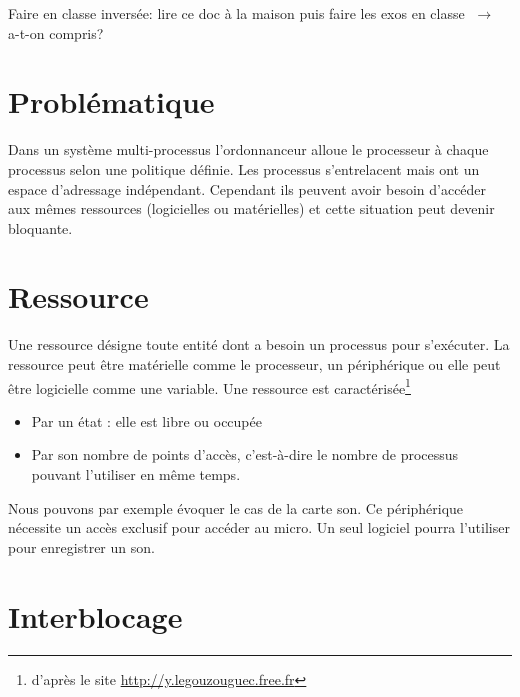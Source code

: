 \documentclass[a4paper,11pt]{article}
\begin{document}
\begin{Form}
\begin{commentprof}
Faire en classe inversée: lire ce doc à la maison puis faire les exos en classe $\;\rightarrow\;$ a-t-on compris?
\end{commentprof}
\section{Problématique}
Dans un système multi-processus l'ordonnanceur alloue le processeur à chaque processus selon une politique définie. Les processus s’entrelacent mais ont un espace d'adressage indépendant. Cependant ils peuvent avoir besoin d'accéder aux mêmes ressources (logicielles ou matérielles) et cette situation peut devenir bloquante.
\begin{center}
\end{center}
\section{Ressource}
Une ressource désigne toute entité dont a besoin un processus pour s'exécuter. La ressource peut être matérielle comme le processeur, un périphérique ou elle peut être logicielle comme une variable. Une ressource est caractérisée\footnote{d'après le site \url{http://y.legouzouguec.free.fr}}
\begin{itemize}
\item Par un état : elle est libre ou occupée
\item Par son nombre de points d'accès, c'est-à-dire le nombre de processus pouvant l’utiliser en même temps.
\end{itemize}
Nous pouvons par exemple évoquer le cas de la carte son. Ce périphérique nécessite un accès exclusif pour accéder au micro. Un seul logiciel pourra l'utiliser pour enregistrer un son.
\section{Interblocage}

\end{Form}
\end{document}

